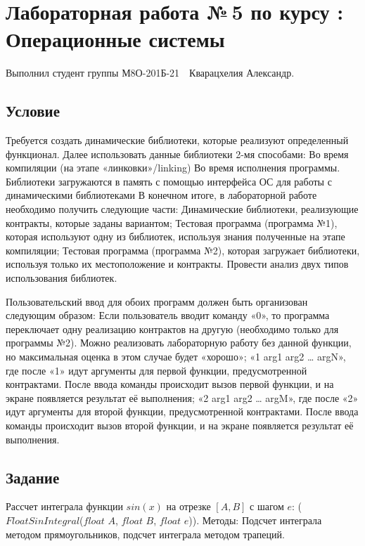 \documentclass[12pt]{article}
\begin{document}
	
	\section*{\centering Лабораторная работа №\,5 по курсу :\\ Операционные системы}
	
	Выполнил студент группы М8О-201Б-21 \,\, Кварацхелия Александр.
	
	\subsection*{Условие}
	
	Требуется создать динамические библиотеки, которые реализуют определенный функционал. 
	Далее использовать данные библиотеки 2-мя способами:
	Во время компиляции (на этапе «линковки»/linking)
	Во время исполнения программы. Библиотеки загружаются в память с помощью 
	интерфейса ОС для работы с динамическими библиотеками
	В конечном итоге, в лабораторной работе необходимо получить следующие части:
	Динамические библиотеки, реализующие контракты, которые заданы вариантом;
	Тестовая программа (программа №1), которая используют одну из библиотек, используя 
	знания полученные на этапе компиляции;
	Тестовая программа (программа №2), которая загружает библиотеки, используя только их 
	местоположение и контракты.
	Провести анализ двух типов использования библиотек.
	
	Пользовательский ввод для обоих программ должен быть организован следующим образом:
	Если пользователь вводит команду «0», то программа переключает одну реализацию 
	контрактов на другую (необходимо только для программы №2). Можно реализовать 
	лабораторную работу без данной функции, но максимальная оценка в этом случае будет 
	«хорошо»;
	«1 arg1 arg2 … argN», где после «1» идут аргументы для первой функции, предусмотренной 
	контрактами. После ввода команды происходит вызов первой функции, и на экране 
	появляется результат её выполнения;
	«2 arg1 arg2 … argM», где после «2» идут аргументы для второй функции, 
	предусмотренной контрактами. После ввода команды происходит вызов второй функции, 
	и на экране появляется результат её выполнения.
	
	\subsection*{Задание}
	
	Рассчет интеграла функции $sin(x)$ на отрезке $[A, B]$ с шагом $e$: ($Float SinIntegral$($float$ $A$, $float$ $B$, $float$ $e$)). Методы: Подсчет интеграла методом прямоугольников, подсчет интеграла методом трапеций.
	
\end{document}
